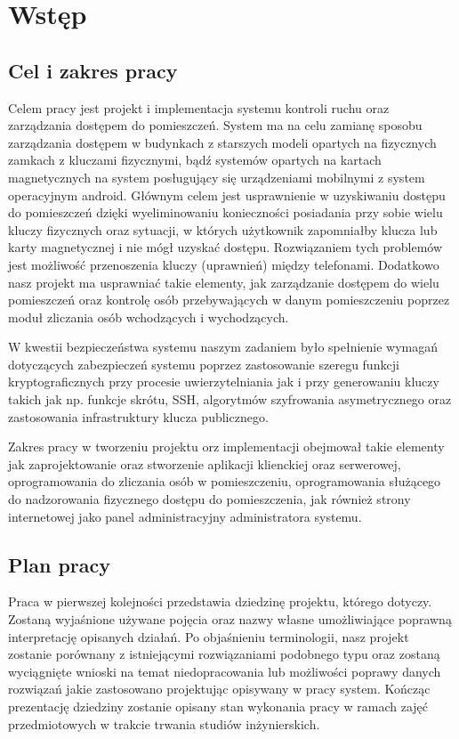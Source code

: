\newpage\section{Wstęp}\label{sec:wstep}

\subsection{Cel i zakres pracy}

	Celem pracy jest projekt i implementacja systemu kontroli ruchu oraz zarządzania dostępem do pomieszczeń. System ma na celu zamianę sposobu zarządzania dostępem w budynkach z starszych modeli opartych na fizycznych zamkach z kluczami fizycznymi, bądź systemów opartych na kartach magnetycznych na system posługujący się urządzeniami mobilnymi z system operacyjnym android. Głównym celem jest usprawnienie w uzyskiwaniu dostępu do pomieszczeń dzięki wyeliminowaniu konieczności posiadania przy sobie wielu kluczy fizycznych oraz sytuacji, w których użytkownik zapomniałby klucza lub karty magnetycznej i nie mógł uzyskać dostępu. Rozwiązaniem tych problemów jest możliwość przenoszenia kluczy (uprawnień) między telefonami. Dodatkowo nasz projekt ma usprawniać takie elementy, jak zarządzanie dostępem do wielu pomieszczeń oraz kontrolę osób przebywających w danym pomieszczeniu poprzez moduł zliczania osób wchodzących i wychodzących.
	
W kwestii bezpieczeństwa systemu naszym zadaniem było spełnienie wymagań dotyczących zabezpieczeń systemu poprzez zastosowanie szeregu funkcji kryptograficznych przy procesie uwierzytelniania jak i przy generowaniu kluczy takich jak np. funkcje skrótu, SSH, algorytmów szyfrowania asymetrycznego oraz zastosowania infrastruktury klucza publicznego.

Zakres pracy w tworzeniu projektu orz implementacji obejmował takie elementy jak zaprojektowanie oraz stworzenie aplikacji klienckiej oraz serwerowej, oprogramowania do zliczania osób w pomieszczeniu, oprogramowania służącego do nadzorowania fizycznego dostępu do pomieszczenia, jak również strony internetowej jako panel administracyjny administratora systemu.

\newpage
\subsection{Plan pracy}
Praca w pierwszej kolejności przedstawia dziedzinę projektu, którego dotyczy. Zostaną wyjaśnione używane pojęcia oraz nazwy własne umożliwiające poprawną interpretację opisanych działań. Po objaśnieniu terminologii, nasz projekt zostanie porównany z istniejącymi rozwiązaniami podobnego typu oraz zostaną wyciągnięte wnioski na temat niedopracowania lub możliwości poprawy danych rozwiązań jakie zastosowano projektując opisywany w pracy system. Kończąc prezentację dziedziny zostanie opisany stan wykonania pracy w ramach zajęć przedmiotowych w trakcie trwania studiów inżynierskich.

